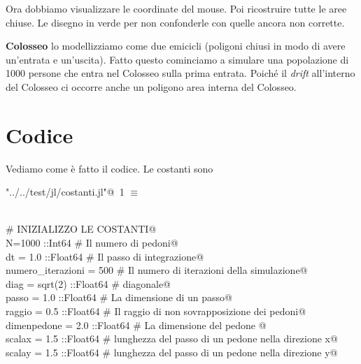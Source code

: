 \documentclass[]{article}
\begin{document}
Ora dobbiamo visualizzare le coordinate del mouse.
Poi ricostruire tutte le aree chiuse.
Le disegno in verde per non confonderle con quelle ancora non corrette.

{\bf Colosseo} lo modellizziamo come due emicicli (poligoni chiusi in modo di avere un'entrata e un'uscita).
Fatto questo cominciamo a simulare una popolazione di 1000 persone che entra nel Colosseo sulla prima entrata.
Poiché il {\sl drift} all'interno del Colosseo ci occorre anche un poligono area interna del Colosseo.
\section{Codice}
Vediamo come è fatto il codice.
Le costanti sono

\begin{flushleft} \small
\begin{minipage}{\linewidth} \label{scrap1}
\protect{}\verb@"../../test/jl/costanti.jl"@\nobreak\ {\footnotesize 1 }$\equiv$
\vspace{-1ex}
\begin{list}{}{} \item
\mbox{}\verb@@\\
\mbox{}\verb@# INIZIALIZZO LE COSTANTI@\\
\mbox{}\verb@const N=1000 ::Int64          # Il numero di pedoni@\\
\mbox{}\verb@const dt = 1.0 ::Float64         # Il passo di integrazione@\\
\mbox{}\verb@const numero_iterazioni = 500    # Il numero di iterazioni della simulazione@\\
\mbox{}\verb@const diag = sqrt(2) ::Float64      # diagonale@\\
\mbox{}\verb@const passo = 1.0 ::Float64         # La dimensione di un passo@\\
\mbox{}\verb@const raggio = 0.5 ::Float64     # Il raggio di non sovrapposizione dei pedoni@\\
\mbox{}\verb@const dimenpedone = 2.0 ::Float64   # La dimensione del pedone @\\
\mbox{}\verb@const scalax = 1.5 ::Float64     # lunghezza del passo di un pedone nella direzione x@\\
\mbox{}\verb@const scalay = 1.5 ::Float64     # lunghezza del passo di un pedone nella direzione y@\\
\mbox{}\verb@@{\NWsep}
\end{list}
\vspace{-2ex}
\end{minipage}\\[4ex]
\end{flushleft}
\end{document}
